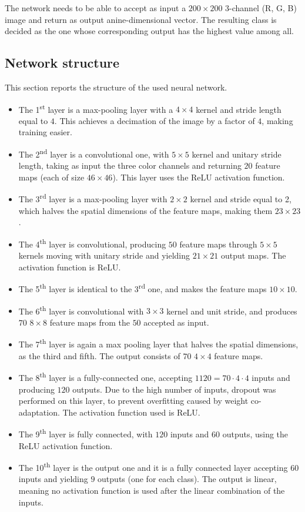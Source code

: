 \documentclass[12pt]{article}
\begin{document}
The network needs to be able to accept as input a $200 \times 200$ 3-channel (R, G, B) image and return as output anine-dimensional vector.
The resulting class is decided as the one whose corresponding output has the highest value among all.

\subsection{Network structure}\label{sec:structure}

This section reports the structure of the used neural network.

\begin{itemize}
  \item The 1\textsuperscript{st} layer is a max-pooling layer with a $4 \times 4$ kernel and stride length equal to $4$. This achieves a decimation of the image by a factor of $4$, making training easier.
  \item The 2\textsuperscript{nd} layer is a convolutional one, with $5 \times 5$ kernel and unitary stride length, taking as input the three color channels and returning $20$ feature maps (each of size $46 \times 46$). This layer uses the ReLU activation function.
  \item The 3\textsuperscript{rd} layer is a max-pooling layer with $2 \times 2$ kernel and stride equal to 2, which halves the spatial dimensions of the feature maps, making them $23 \times 23$.
  \item The 4\textsuperscript{th} layer is convolutional, producing $50$ feature maps through $5 \times 5$ kernels moving with unitary stride and yielding $21 \times 21$ output maps. The activation function is ReLU\@.
  \item The 5\textsuperscript{th} layer is identical to the 3\textsuperscript{rd} one, and makes the feature maps $10 \times 10$.
  \item The 6\textsuperscript{th} layer is convolutional with $3 \times 3$ kernel and unit stride, and produces $70$ $8 \times 8$ feature maps from the $50$ accepted as input.
  \item The 7\textsuperscript{th} layer is again a max pooling layer that halves the spatial dimensions, as the third and fifth. The output consists of $70$ $4 \times 4$ feature maps.
  \item The 8\textsuperscript{th} layer is a fully-connected one, accepting $1120 = 70 \cdot 4 \cdot 4$ inputs and producing $120$ outputs. Due to the high number of inputs, dropout was performed on this layer, to prevent overfitting caused by weight co-adaptation. The activation function used is ReLU.
  \item The 9\textsuperscript{th} layer is fully connected, with $120$ inputs and $60$ outputs, using the ReLU activation function.
  \item The 10\textsuperscript{th} layer is the output one and it is a fully connected layer accepting $60$ inputs and yielding $9$ outputs (one for each class). The output is linear, meaning no activation function is used after the linear combination of the inputs.
\end{itemize}
\end{document}
